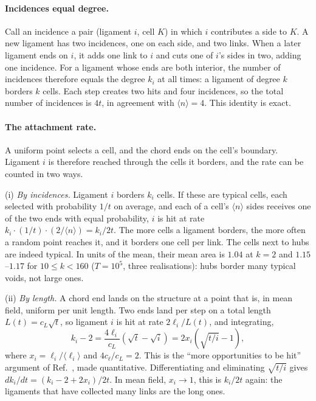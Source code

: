 \documentclass[pre,twocolumn,superscriptaddress,amsmath,amssymb,floatfix]{revtex4-2}
\begin{document}
\paragraph*{Incidences equal degree.}
Call an incidence a pair (ligament $i$, cell $K$) in which $i$ contributes a side to
$K$. A new ligament has two incidences, one on each side, and two links. When a later
ligament ends on $i$, it adds one link to $i$ and cuts one of $i$'s sides in two, adding
one incidence. For a ligament whose ends are both interior, the number of incidences
therefore equals the degree $k_i$ at all times: a ligament of degree $k$ borders $k$
cells. Each step creates two hits and four incidences, so the total number of
incidences is $4t$, in agreement with $\langle n\rangle=4$. This identity is exact.

\paragraph*{The attachment rate.}
A uniform point selects a cell, and the chord ends
on the cell's boundary. Ligament $i$ is therefore reached through the cells it borders,
and the rate can be counted in two ways.

(i) \emph{By incidences.} Ligament $i$ borders $k_i$ cells. If these are typical cells,
each selected with probability $1/t$ on average, and each of a cell's $\langle n\rangle$
sides receives one of the two ends with equal probability, $i$ is hit at rate
$k_i\cdot(1/t)\cdot(2/\langle n\rangle)=k_i/2t$. The more cells a ligament borders, the
more often a random point reaches it, and it borders one cell per link. The cells next
to hubs are indeed typical. In units of the mean, their mean area is $1.04$ at $k=2$ and
$1.15$--$1.17$ for $10\le k<160$ ($T=10^5$, three realisations): hubs border many typical
voids, not large ones.

(ii) \emph{By length.} A chord end lands on the structure at a point that is, in mean
field, uniform per unit length. Two ends land per step on a total length
$L(t)=c_L\sqrt t$, so ligament $i$ is hit at rate $2\ell_i/L(t)$, and integrating,
\begin{equation}
  k_i-2=\frac{4\ell_i}{c_L}\left(\sqrt t-\sqrt i\right)=2x_i\left(\sqrt{t/i}-1\right),
  \label{eq:kl}
\end{equation}
where $x_i=\ell_i/\langle\ell_i\rangle$ and $4c_\ell/c_L=2$. This is the ``more
opportunities to be hit'' argument of Ref.~\cite{both2026}, made quantitative.
Differentiating and eliminating $\sqrt{t/i}$ gives $dk_i/dt=(k_i-2+2x_i)/2t$. In mean
field, $x_i\to1$, this is $k_i/2t$ again: the ligaments that have collected many links are
the long ones.
\end{document}
